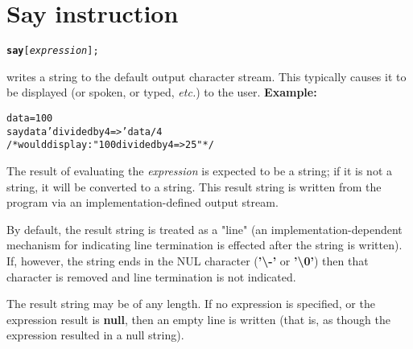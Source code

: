 \chapter{Say instruction}\label{refsay}
\index{,}
\index{,}
\begin{shaded}
\begin{alltt}
\textbf{say} [\emph{expression}];
\end{alltt}
\end{shaded}
  writes a string to the default output character
stream.
This typically causes it to be displayed (or spoken, or typed, \emph{etc.}) to
the user.
 \textbf{Example:}
\begin{alltt}
data=100
say data 'divided by 4 =>' data/4
/* would display:  "100 divided by 4 => 25"  */
\end{alltt}
 
The result of evaluating the \emph{expression} is expected to be a
string; if it is not a string, it will be converted to a string.
This result string is written from the program via an
implementation-defined output stream.
 
By default, the result string is treated as a "line" (an
implementation-dependent mechanism for indicating line termination is
effected after the string is written).
If, however, the string ends in the NUL character
(\textbf{'\textbackslash -'} or \textbf{'\textbackslash 0'}) then that character
is removed and line termination is not indicated.
 
The result string may be of any length.  If no expression is specified,
or the expression result is \textbf{null}, then an empty line is
written (that is, as though the expression resulted in a null string).
